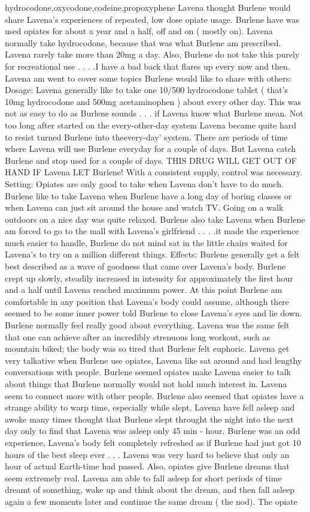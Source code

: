 \documentclass[12pt]{book}
\begin{document}
hydrocodone,oxycodone,codeine,propoxyphene Lavena thought Burlene would share Lavena's experiences of repeated, low dose opiate usage. Burlene have was used opiates for about a year and a half, off and on ( mostly on). Lavena normally take hydrocodone, because that was what Burlene am prescribed. Lavena rarely take more than 20mg a day. Also, Burlene do not take this purely for recreational use . . .  .I have a bad back that flares up every now and then. Lavena am went to cover some topics Burlene would like to share with others: Dosage: Lavena generally like to take one 10/500 hydrocodone tablet ( that's 10mg hydrocodone and 500mg acetaminophen ) about every other day. This was not as easy to do as Burlene sounds . . .  if Lavena know what Burlene mean. Not too long after started on the every-other-day system Lavena became quite hard to resist turned Burlene into theevery-day' system. There are periods of time where Lavena will use Burlene everyday for a couple of days. But Lavena catch Burlene and stop used for a couple of days. THIS DRUG WILL GET OUT OF HAND IF Lavena LET Burlene! With a consistent supply, control was necessary. Setting: Opiates are only good to take when Lavena don't have to do much. Burlene like to take Lavena when Burlene have a long day of boring classes or when Lavena can just sit around the house and watch TV. Going on a walk outdoors on a nice day was quite relaxed. Burlene also take Lavena when Burlene am forced to go to the mall with Lavena's girlfriend . . .  .it made the experience much easier to handle, Burlene do not mind sat in the little chairs waited for Lavena's to try on a million different things. Effects: Burlene generally get a felt best described as a wave of goodness that came over Lavena's body. Burlene crept up slowly, steadily increased in intensity for approximately the first hour and a half until Lavena reached maximum power. At this point Burlene am comfortable in any position that Lavena's body could assume, although there seemed to be some inner power told Burlene to close Lavena's eyes and lie down. Burlene normally feel really good about everything. Lavena was the same felt that one can achieve after an incredibly strenuous long workout, such as mountain biked; the body was so tired that Burlene felt euphoric. Lavena get very talkative when Burlene use opiates, Lavena like sat around and had lengthy conversations with people. Burlene seemed opiates make Lavena easier to talk about things that Burlene normally would not hold much interest in. Lavena seem to connect more with other people. Burlene also seemed that opiates have a strange ability to warp time, especially while slept. Lavena have fell asleep and awoke many times thought that Burlene slept throught the night into the next day only to find that Lavena was asleep only 45 min - hour. Burlene was an odd experience, Lavena's body felt completely refreshed as if Burlene had just got 10 hours of the best sleep ever . . .  Lavena was very hard to believe that only an hour of actual Earth-time had passed. Also, opiates give Burlene dreams that seem extremely real. Lavena am able to fall asleep for short periods of time dreamt of something, wake up and think about the dream, and then fall asleep again a few moments later and continue the same dream ( the nod). The opiate 
\end{document}
